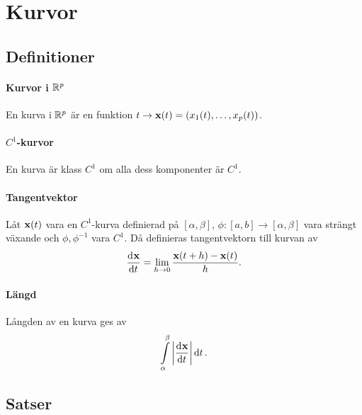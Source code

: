 \section{Kurvor}

\subsection{Definitioner}

\paragraph{Kurvor i $\mathbb{R}^p$}
En kurva i $\mathbb{R}^p$ är en funktion $t\to\vect{x}(t) = (x_1(t), \dots, x_p(t))$.

\paragraph{$C^1$-kurvor}
En kurva är klass $C^1$ om alla dess komponenter är $C^1$.

\paragraph{Tangentvektor}
Låt $\vect{x}(t)$ vara en $C^1$-kurva definierad på $[\alpha, \beta]$, $\phi: [a, b]\to [\alpha, \beta]$ vara strängt växande och $\phi, \phi^{-1}$ vara $C^1$. Då definieras tangentvektorn till kurvan av
\begin{align*}
	\deval{\vect{x}}{t}{t} = \limit{h}{0}\frac{\vect{x}(t + h) - \vect{x}(t)}{h}.
\end{align*}

\paragraph{Längd}
Långden av en kurva ges av
\begin{align*}
	\int\limits_{\alpha}^{\beta}\abs{\deval{\vect{x}}{t}{t}}\dd{t}.
\end{align*}

\subsection{Satser}